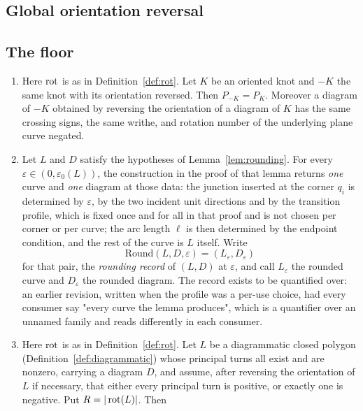 \subsection{Global orientation reversal}



\subsection{The floor}

\begin{theorem}\label{thm:carrierfloor}
\begin{enumerate}
\item[(R)] Here $\operatorname{rot}$ is as in Definition~\ref{def:rot}.
Let $K$ be an oriented knot and $-K$ the same knot with its orientation
reversed. Then $P_{-K}=P_{K}$. Moreover a diagram of $-K$ obtained by reversing
the orientation of a diagram of $K$ has the same crossing signs, the same
writhe, and rotation number of the underlying plane curve negated.
\item[(A)] Let $L$ and $D$ satisfy the hypotheses of Lemma~\ref{lem:rounding}. For every
$\varepsilon\in(0,\varepsilon_0(L))$, the construction in the proof of that
lemma returns \emph{one} curve and \emph{one} diagram at those data: the
junction inserted at the corner $q_i$ is determined by $\varepsilon$, by the
two incident unit directions and by the transition profile, which is fixed once
and for all in that proof and is not chosen per corner or per curve; the arc
length $\ell$ is then determined by the endpoint condition, and the rest of the
curve is $L$ itself. Write
\[
   \mathrm{Round}(L,D,\varepsilon)=(L_\varepsilon,D_\varepsilon)
\]
for that pair, the \emph{rounding record} of $(L,D)$ at $\varepsilon$, and call
$L_\varepsilon$ the rounded curve and $D_\varepsilon$ the rounded diagram. The
record exists to be quantified over: an earlier revision, written when the
profile was a per-use choice, had every consumer say "every curve the lemma
produces", which is a quantifier over an unnamed family and reads differently
in each consumer.
\item[(B)] Here $\operatorname{rot}$ is as in Definition~\ref{def:rot}.
Let $L$ be a diagrammatic closed polygon (Definition~\ref{def:diagrammatic})
whose principal turns all exist and are nonzero, carrying a diagram $D$, and
assume, after reversing the orientation of $L$ if necessary, that either every
principal turn is positive, or exactly one is negative. Put $R=|\operatorname{rot}(L)|$. Then

\end{enumerate}
\end{theorem}
